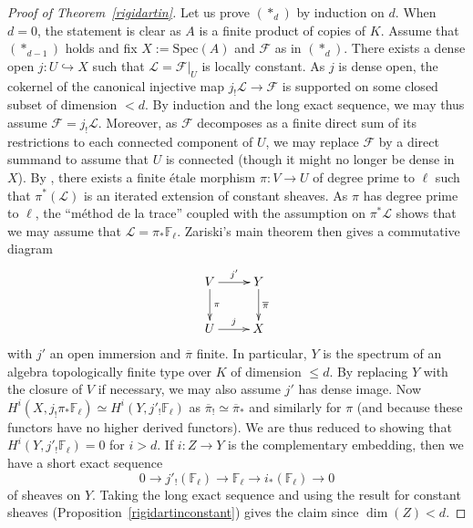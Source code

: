 \documentclass[reqno]{amsart}
\newcommand{\sF}{\mathcal{F}}
\newcommand{\spec}{\mathrm{Spec}}
\theoremstyle{definition}
\begin{document}
\begin{proof}[Proof of Theorem~\ref{rigidartin}]
\newcommand{\sL}{\mathcal{L}}
Let us prove $(\ast_d)$ by induction on $d$. When $d=0$, the statement is clear
as $A$ is a finite product of copies of $K$. Assume that $(\ast_{d-1})$ holds
and fix $X := \spec(A)$ and $\sF$ as in $(\ast_d)$. There exists a dense open
$j \colon U \hookrightarrow X$ such that $\sL = \sF|_U$ is locally constant. As $j$ is
dense open, the cokernel of the canonical injective map $j_! \sL \to \sF$ is
supported on some closed subset of dimension $< d$. By induction and the long
exact sequence, we may thus assume $\sF = j_! \sL$. Moreover, as $\sF$
decomposes as a finite direct sum of its restrictions to each connected
component of $U$, we may replace $\sF$ by a direct summand to assume that $U$ is
connected (though it might no longer be dense in $X$). By \cite[Tag
0A3R]{stacks-project}, there exists a finite \'etale morphism $\pi\colon V \to U$ of
degree prime to $\ell$ such that $\pi^*(\sL)$ is an iterated extension of
constant sheaves. As $\pi$ has degree prime to $\ell$, the ``m\'ethod de la
trace'' \cite[Tag 03SH]{stacks-project} coupled with the assumption on $\pi^*
\sL$ shows that we may assume that $\sL = \pi_* \mathbb{F}_\ell$. Zariski's main theorem then gives a commutative diagram
\[ \xymatrix{ V \ar[r]^-{j'} \ar[d]^-{\pi} & Y \ar[d]^-{\overline{\pi}} \\
		U \ar[r]^-{j} & X}\]
with $j'$ an open immersion and $\overline{\pi}$ finite. In particular, $Y$ is
the spectrum of an algebra topologically finite type  over $K$ of dimension $\leq d$.  By replacing $Y$ with the closure of $V$ if necessary, we may also assume $j'$ has dense image. Now $H^i(X, j_! \pi_* \mathbb{F}_\ell) \simeq H^i(Y, j'_! \mathbb{F}_\ell)$ as $\overline{\pi}_! \simeq \overline{\pi}_*$ and similarly for $\pi$ (and because these functors have no higher derived functors). We are thus reduced to showing that $H^i(Y, j'_! \mathbb{F}_\ell) = 0$ for $i > d$.  If $i\colon Z \to Y$ is the complementary embedding, then we have a short exact sequence
\[ 0 \to j'_! ( \mathbb{F}_\ell) \to \mathbb{F}_\ell \to i_* (\mathbb{F}_\ell) \to 0\]
of sheaves on $Y$. Taking the long exact sequence and using the result for constant sheaves (Proposition~\ref{rigidartinconstant}) gives the claim since $\dim(Z) < d$.
\end{proof} 


\newpage


 
\end{document}
